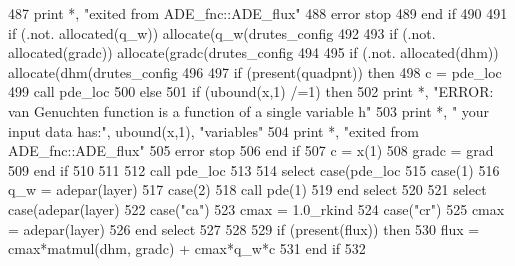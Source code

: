 \begin{DoxyCode}
487         print *, \textcolor{stringliteral}{"exited from ADE\_fnc::ADE\_flux"}
488         error stop
489 \textcolor{keywordflow}{      end if}
490       
491       \textcolor{keywordflow}{if} (.not. \textcolor{keyword}{allocated}(q\_w)) \textcolor{keyword}{allocate}(q\_w(drutes_config%
492 
493       \textcolor{keywordflow}{if} (.not. \textcolor{keyword}{allocated}(gradc)) \textcolor{keyword}{allocate}(gradc(drutes_config%
494       
495       \textcolor{keywordflow}{if} (.not. \textcolor{keyword}{allocated}(dhm)) \textcolor{keyword}{allocate}(dhm(drutes_config%
496 \textcolor{comment}{      }
497 \textcolor{comment}{      }\textcolor{keywordflow}{if} (\textcolor{keyword}{present}(quadpnt)) \textcolor{keywordflow}{then}
498         c = pde\_loc%
499         \textcolor{keyword}{call }pde\_loc%
500       \textcolor{keywordflow}{else}
501         \textcolor{keywordflow}{if} (ubound(x,1) /=1) \textcolor{keywordflow}{then}
502           print *, \textcolor{stringliteral}{"ERROR: van Genuchten function is a function of a single variable h"}
503           print *, \textcolor{stringliteral}{"       your input data has:"}, ubound(x,1), \textcolor{stringliteral}{"variables"}
504           print *, \textcolor{stringliteral}{"exited from ADE\_fnc::ADE\_flux"}
505           error stop
506 \textcolor{keywordflow}{        end if}
507         c = x(1)
508         gradc = grad
509 \textcolor{keywordflow}{      end if}
510       
511       
512       \textcolor{keyword}{call }pde\_loc%
513 \textcolor{comment}{      }
514 \textcolor{comment}{      }\textcolor{keywordflow}{select case}(pde\_loc%
515         \textcolor{keywordflow}{case}(1)
516           q\_w = adepar(layer)%
517         \textcolor{keywordflow}{case}(2)
518           \textcolor{keyword}{call }pde(1)%
519 \textcolor{keywordflow}{      end select}
520       
521       \textcolor{keywordflow}{select case}(adepar(layer)%
522         \textcolor{keywordflow}{case}(\textcolor{stringliteral}{"ca"})
523           cmax = 1.0\_rkind
524          \textcolor{keywordflow}{case}(\textcolor{stringliteral}{"cr"})
525           cmax = adepar(layer)%
526 \textcolor{keywordflow}{      end select}
527       
528       
529       \textcolor{keywordflow}{if} (\textcolor{keyword}{present}(flux)) \textcolor{keywordflow}{then}
530         flux = cmax*matmul(dhm, gradc) + cmax*q\_w*c
531 \textcolor{keywordflow}{      end if}
532     
\end{DoxyCode}


